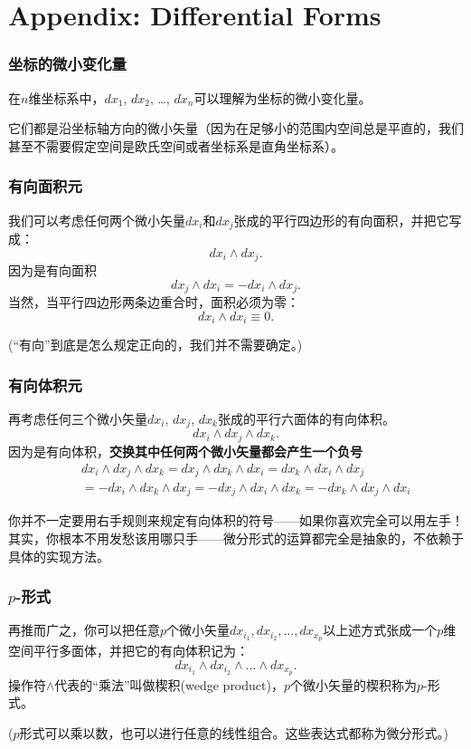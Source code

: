 \documentclass[CJK]{beamer}
\begin{document}
\appendix

\section{Appendix: Differential Forms}

\begin{frame}
  \frametitle{坐标的微小变化量}
  在$n$维坐标系中，$dx_1$, $dx_2$, \ldots, $dx_n$可以理解为坐标的微小变化量。

  它们都是沿坐标轴方向的微小矢量（因为在足够小的范围内空间总是平直的，我们甚至不需要假定空间是欧氏空间或者坐标系是直角坐标系）。
  
\end{frame}

\begin{frame}
  \frametitle{有向面积元}

  我们可以考虑任何两个微小矢量$dx_i$和$dx_j$张成的平行四边形的有向面积，并把它写成：
  $$ dx_i\wedge dx_j.$$
  因为是有向面积
  $$ dx_j\wedge dx_i = - dx_i\wedge dx_j. $$
  当然，当平行四边形两条边重合时，面积必须为零：
  $$ dx_i\wedge dx_i \equiv 0.$$

  \skiplines
  
  (“有向”到底是怎么规定正向的，我们并不需要确定。)
  
\end{frame}


\begin{frame}
  \frametitle{有向体积元}

  再考虑任何三个微小矢量$dx_i$, $dx_j$, $dx_k$张成的平行六面体的有向体积。
  $$ dx_i\wedge dx_j\wedge dx_k.$$
  因为是有向体积，{\bf 交换其中任何两个微小矢量都会产生一个负号}
  \begin{eqnarray}
    && dx_i\wedge dx_j\wedge dx_k = dx_j\wedge dx_k\wedge dx_i = dx_k\wedge dx_i\wedge dx_j \nonumber \\
   && = - dx_i\wedge dx_k\wedge dx_j = - dx_j\wedge dx_i\wedge dx_k = -dx_k\wedge dx_j\wedge dx_i \nonumber
  \end{eqnarray}

  你并不一定要用右手规则来规定有向体积的符号——如果你喜欢完全可以用左手！其实，你根本不用发愁该用哪只手——微分形式的运算都完全是抽象的，不依赖于具体的实现方法。
\end{frame}



\begin{frame}
  \frametitle{$p$-形式}
  再推而广之，你可以把任意$p$个微小矢量$dx_{i_1}, dx_{i_2},\ldots, dx_{x_p}$以上述方式张成一个$p$维空间平行多面体，并把它的有向体积记为：
  $$dx_{i_1}\wedge dx_{i_2}\wedge \ldots\wedge dx_{x_p}.$$
  操作符$\wedge$代表的``乘法''叫做楔积(wedge product)，$p$个微小矢量的楔积称为{\blue $p$-形式}。

  \skipline
  
  ($p$形式可以乘以数，也可以进行任意的线性组合。这些表达式都称为微分形式。)

\end{frame}
\end{document}
